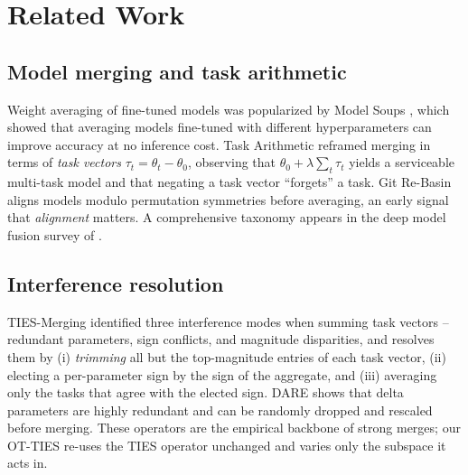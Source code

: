 \documentclass[11pt]{article}
\newcommand{\otties}{\textsc{OT-TIES}}
\begin{document}
\section{Related Work}
\label{sec:related}

\subsection{Model merging and task arithmetic}
Weight averaging of fine-tuned models was popularized by Model Soups \citep{wortsman2022soups}, which
showed that averaging models fine-tuned with different hyperparameters can improve accuracy at no
inference cost. Task Arithmetic \citep{ilharco2023task} reframed merging in terms of \emph{task
vectors} $\tau_t = \theta_t - \theta_0$, observing that $\theta_0 + \lambda \sum_t \tau_t$ yields a
serviceable multi-task model and that negating a task vector ``forgets'' a task. Git Re-Basin
\citep{ainsworth2023rebasin} aligns models modulo permutation symmetries before averaging, an early
signal that \emph{alignment} matters. A comprehensive taxonomy appears in the deep model fusion survey
of \citet{li2023deepfusion}.

\subsection{Interference resolution}
TIES-Merging \citep{yadav2023ties} identified three interference modes when summing task vectors --
redundant parameters, sign conflicts, and magnitude disparities, and resolves them by
(i) \emph{trimming} all but the top-magnitude entries of each task vector, (ii) electing a per-parameter
sign by the sign of the aggregate, and (iii) averaging only the tasks that agree with the elected sign.
DARE \citep{yu2024dare} shows that delta parameters are highly redundant and can be randomly dropped and
rescaled before merging. These operators are the empirical backbone of strong merges; our \otties{}
re-uses the TIES operator unchanged and varies only the subspace it acts in.
\end{document}
